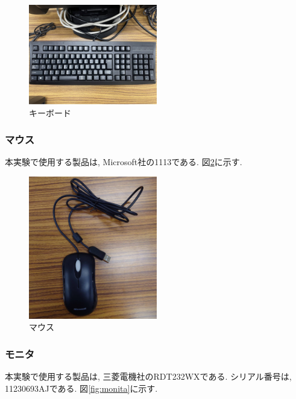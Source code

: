 \documentclass{ltjsarticle} %
\begin{document}
\begin{figure}[H] %
  \centering
  \includegraphics[width=0.5\textwidth]{keyboard.jpg} %
  \caption{キーボード} %
  \label{fig:keyboard} %
\end{figure}


\subsubsection{マウス}
本実験で使用する製品は, Microsoft社の1113である. 図\ref{fig:mouse1}に示す.

\begin{figure}[H] %
  \centering
  \includegraphics[width=0.5\textwidth]{mouse1.jpg} %
  \caption{マウス} %
  \label{fig:mouse1} %
\end{figure}


\subsubsection{モニタ}
本実験で使用する製品は,  三菱電機社のRDT232WXである. シリアル番号は, 11230693AJである. 図\ref{fig:monita}に示す.
\end{document}
